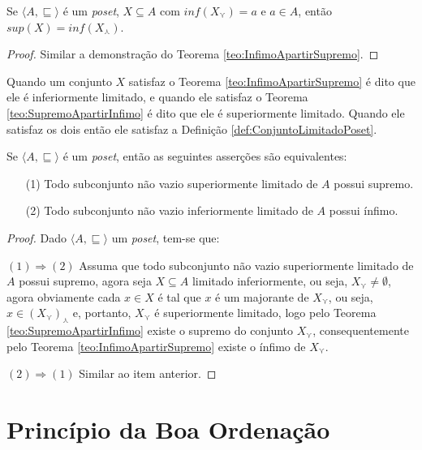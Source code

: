 \begin{theorem}\label{teo:SupremoApartirInfimo}
	Se $\langle A, \sqsubseteq \rangle$ é um \textit{poset}, $X \subseteq A$ com $inf(X_\curlyvee) = a$ e $a \in A$, então $sup(X) = inf(X_\curlywedge) $.
\end{theorem}

\begin{proof}
	Similar a demonstração do Teorema \ref{teo:InfimoApartirSupremo}.
\end{proof}

\begin{remark}
	Quando um conjunto $X$ satisfaz o Teorema  \ref{teo:InfimoApartirSupremo} é dito que ele é inferiormente limitado, e quando ele satisfaz o Teorema \ref{teo:SupremoApartirInfimo} é dito que ele é superiormente limitado. Quando ele satisfaz os dois então ele satisfaz a Definição \ref{def:ConjuntoLimitadoPoset}.
\end{remark}

\begin{theorem}
	Se $\langle A, \sqsubseteq \rangle$ é um \textit{poset}, então as seguintes asserções são equivalentes:
	\begin{itemize}
		\item[(1)] Todo subconjunto não vazio superiormente limitado de $A$ possui supremo.
		\item[(2)] Todo subconjunto não vazio inferiormente limitado de $A$ possui ínfimo.
	\end{itemize}
\end{theorem}
	
\begin{proof}
	Dado $\langle A, \sqsubseteq \rangle$ um \textit{poset}, tem-se que:
	
	$(1) \Rightarrow (2)$ Assuma que todo subconjunto não vazio superiormente limitado de $A$ possui supremo, agora seja $X \subseteq A$ limitado inferiormente, ou seja, $X_\curlyvee \neq \emptyset$, agora obviamente cada $x \in X$ é tal que $x$ é um majorante de $X_\curlyvee$, ou seja, $x \in (X_\curlyvee)_\curlywedge$ e, portanto, $X_\curlyvee$ é superiormente limitado, logo pelo Teorema \ref{teo:SupremoApartirInfimo} existe o supremo do conjunto $X_\curlyvee$, consequentemente pelo Teorema \ref{teo:InfimoApartirSupremo} existe o ínfimo de $X_\curlyvee$.
	
	$(2) \Rightarrow (1)$ Similar ao item anterior.
\end{proof}

\section{Princípio da Boa Ordenação}

